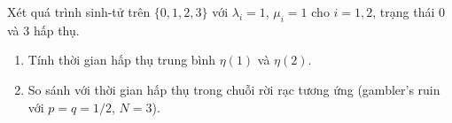 \begin{exercise}
Xét quá trình sinh-tử trên $\{0, 1, 2, 3\}$ với $\lambda_i = 1$, $\mu_i = 1$ cho $i = 1, 2$,
trạng thái $0$ và $3$ hấp thụ.
\begin{enumerate}[nosep]
  \item Tính thời gian hấp thụ trung bình $\eta(1)$ và $\eta(2)$.
  \item So sánh với thời gian hấp thụ trong chuỗi rời rạc tương ứng (gambler's ruin với $p = q = 1/2$, $N = 3$).
\end{enumerate}
\end{exercise}
